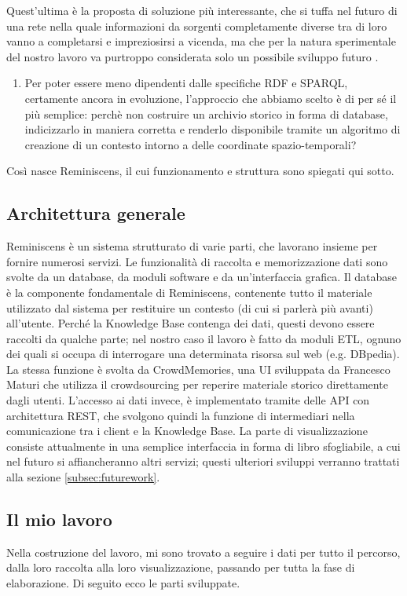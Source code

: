 \documentclass[sigproc-sp.tex]{subfiles}
\begin{document}
Quest’ultima è la proposta di soluzione più interessante, che si tuffa nel futuro di una rete nella quale informazioni da sorgenti completamente diverse tra di loro vanno a completarsi e impreziosirsi a vicenda, ma che per la natura sperimentale del nostro lavoro va purtroppo considerata solo un possibile sviluppo futuro .

\begin{enumerate}[resume]
\item Per poter essere meno dipendenti dalle specifiche RDF e SPARQL, certamente ancora in evoluzione, l’approccio che abbiamo scelto è di per sé il più semplice: perchè non costruire un archivio storico in forma di database, indicizzarlo in maniera corretta e renderlo disponibile tramite un algoritmo di creazione di un contesto intorno a delle coordinate spazio-temporali?
\end{enumerate}

Così nasce Reminiscens, il cui funzionamento e struttura sono spiegati qui sotto.

\subsection{Architettura generale}
Reminiscens è un sistema strutturato di varie parti, che lavorano insieme per fornire numerosi servizi. Le funzionalità di raccolta e memorizzazione dati sono svolte da un database, da moduli software e da un’interfaccia grafica. Il database è la componente fondamentale di Reminiscens, contenente tutto il materiale utilizzato dal sistema per restituire un contesto (di cui si parlerà più avanti) all’utente. Perché la Knowledge Base contenga dei dati, questi devono essere raccolti da qualche parte; nel nostro caso il lavoro è fatto da moduli ETL, ognuno dei quali si occupa di interrogare una determinata risorsa sul web (e.g. DBpedia). La stessa funzione è svolta da CrowdMemories, una UI sviluppata da Francesco Maturi che utilizza il crowdsourcing per reperire materiale storico direttamente dagli utenti. L’accesso ai dati invece, è implementato tramite delle API con architettura REST, che svolgono quindi la funzione di intermediari nella comunicazione tra i client e la Knowledge Base. La parte di visualizzazione consiste attualmente in una semplice interfaccia in forma di libro sfogliabile, a cui nel futuro si affiancheranno altri servizi; questi ulteriori sviluppi verranno trattati alla sezione \ref{subsec:futurework}.

\subsection{Il mio lavoro}
Nella costruzione del lavoro, mi sono trovato a seguire i dati per tutto il percorso, dalla loro raccolta alla loro visualizzazione, passando per tutta la fase di elaborazione. Di seguito ecco le parti sviluppate.
\end{document}
